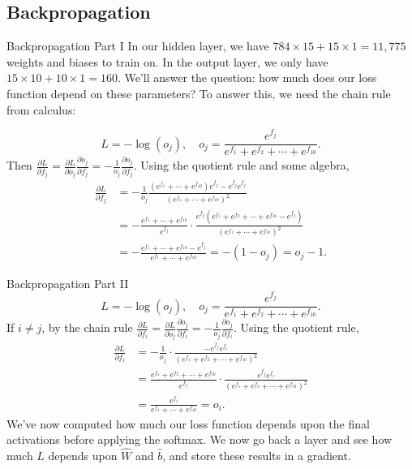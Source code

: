 \documentclass[xcolor=dvipsnames, fontsize=11pt, %
pagesize, %
parskip=half-, t]{beamer}
\begin{document}
 \subsection{Backpropagation}
  \begin{frame}{Backpropagation Part I}
In our hidden layer, we have $784\times 15+15\times 1=11,775$ weights and biases to train on. In the output layer, we only have $15\times 10+10\times 1=160$. \pause We'll answer the question: how much does our loss function depend on these parameters?  To answer this, we need the chain rule from calculus: \pause

$$L=-\log \left(o_j\right), \quad o_j=\frac{e^{f_j}}{e^{f_1}+e^{f_2}+\cdots+e^{f_{10}}}.$$
Then $\frac{\partial L}{\partial f_j}=\frac{\partial L}{\partial o_j}\frac{\partial o_j}{\partial f_j}=-\frac{1}{o_j}\frac{\partial o_j}{\partial f_j}$. Using the quotient rule and some algebra, \pause \begin{align*} \frac{\partial L}{\partial f_j}&=-\frac{1}{o_j}\frac{\left(e^{f_1}+\cdots+e^{f_{10}}\right)e^{f_j}-e^{f_j}e^{f_j}}{\left(e^{f_1}+\cdots+e^{f_{10}}\right)^2} \\ &=-\frac{e^{f_1}+\cdots+e^{f_{10}}}{e^{f_j}}\cdot \frac{e^{f_j}\left(e^{f_1}+e^{f_2}+\cdots+e^{f_{10}}-e^{f_j}\right)}{\left(e^{f_1}+\cdots+e^{f_{10}}\right)^2} \\ &=-\frac{e^{f_1}+\cdots+e^{f_{10}}-e^{f_j}}{e^{f_1}+\cdots+e^{f_{10}}}=-\left(1-o_j\right)=o_j-1. \end{align*}

  \end{frame}
  \begin{frame}{Backpropagation Part II}
$$L=-\log \left(o_j\right), \quad o_j=\frac{e^{f_j}}{e^{f_1}+e^{f_2}+\cdots+e^{f_{10}}}.$$ \pause  If $i\neq j$, by the chain rule $\frac{\partial L}{\partial f_i}=\frac{\partial L}{\partial o_j}\frac{\partial o_j}{\partial f_i}=-\frac{1}{o_j}\frac{\partial o_j}{\partial f_i}.$ \pause Using the quotient rule, \begin{align*} \frac{\partial L}{\partial f_i} &=-\frac{1}{o_j}\cdot \frac{-e^{f_j}e^{f_i}}{\left(e^{f_1}+e^{f_2}+\cdots+e^{f_{10}}\right)^2} \\ &=\frac{e^{f_1}+e^{f_2}+\cdots+e^{f_{10}}}{e^{f_j}}\cdot \frac{e^{f_j}e^{f_i}}{\left(e^{f_1}+e^{f_2}+\cdots+e^{f_{10}}\right)^2} \\ &=\frac{e^{f_i}}{e^{f_1}+\cdots+e^{f_{10}}}=o_i. \end{align*} \pause
We've now computed how much our loss function depends upon the final activations before applying the softmax.  We now go back a layer and see how much $L$ depends upon $\hat{W}$ and $\hat{b}$, and store these results in a gradient.
\end{frame}
\end{document}
